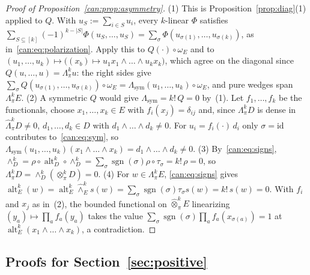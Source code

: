 \documentclass[11pt]{amsart}
\theoremstyle{definition}
\theoremstyle{remark}
\numberwithin{equation}{section}
\newcommand{\sgn}{\operatorname{sgn}}
\newcommand{\id}{\mathrm{id}}
\newcommand{\abs}[1]{\lvert #1\rvert}
\theoremstyle{plain}
\theoremstyle{definition}
\theoremstyle{plain}
\newcommand{\Lsym}{\Lambda_{\mathrm{sym}}}
\begin{document}
\begin{proof}[Proof of Proposition~\ref{can:prop:asymmetry}]
(1) This is Proposition~\ref{prop:diag}(1) applied to $Q$. With $u_S:=\sum_{i\in S}u_i$, every $k$\nobreakdash-linear
$\Phi$ satisfies $\sum_{S\subseteq[k]}(-1)^{k-\abs S}\Phi(u_S,\dots,u_S)=\sum_\sigma\Phi(u_{\sigma(1)},\dots,u_{\sigma(k)})$,
as in~\eqref{can:eq:polarization}. Apply this to $Q(\cdot)\circ\omega_E$ and to
$(u_1,\dots,u_k)\mapsto\bigl((x_b)\mapsto u_1x_1\wedge\dots\wedge u_kx_k\bigr)$, which agree on the diagonal since
$Q(u,\dots,u)=\Lambda^k_\pi u$: the right sides give
$\sum_\sigma Q(u_{\sigma(1)},\dots,u_{\sigma(k)})\circ\omega_E=\Lsym(u_1,\dots,u_k)\circ\omega_E$, and pure wedges span
$\Lambda^k_\pi E$.
(2) A symmetric $Q$ would give $\Lsym=k!\,Q=0$ by~(1). Let $f_1,\dots,f_k$ be the functionals, choose
$x_1,\dots,x_k\in E$ with $f_i(x_j)=\delta_{ij}$ and, since $\Lambda^k_\pi D$ is dense in $\widehat\Lambda^k_\pi D\ne0$,
$d_1,\dots,d_k\in D$ with $d_1\wedge\dots\wedge d_k\ne0$. For $u_i=f_i(\cdot)\,d_i$ only $\sigma=\id$ contributes
to~\eqref{can:eq:sym}, so $\Lsym(u_1,\dots,u_k)(x_1\wedge\dots\wedge x_k)=d_1\wedge\dots\wedge d_k\ne0$.
(3) By~\eqref{can:eq:signs},
$\wedge^k_D=\rho\circ\operatorname{alt}^k_D\circ\wedge^k_D=\sum_\sigma\sgn(\sigma)\rho\circ\tau_\sigma=k!\,\rho=0$, so
$\Lambda^k_\pi D=\wedge^k_D(\otimes^k_\pi D)=0$.
(4) For $w\in\Lambda^k_\pi E$, \eqref{can:eq:signs} gives
$\operatorname{alt}^k_E(w)=\operatorname{alt}^k_E\widehat\wedge^k_Es(w)=\sum_\sigma\sgn(\sigma)\tau_\sigma s(w)=k!\,s(w)=0$.
With $f_i$ and $x_j$ as in~(2), the bounded functional on $\widehat\otimes^k_\pi E$ linearizing
$(y_a)\mapsto\prod_af_a(y_a)$ takes the value $\sum_\sigma\sgn(\sigma)\prod_af_a(x_{\sigma(a)})=1$ at
$\operatorname{alt}^k_E(x_1\wedge\dots\wedge x_k)$, a contradiction.
\end{proof}
\subsection{Proofs for Section~\ref{sec:positive}}\label{dfr:ssec:positive}
\end{document}

